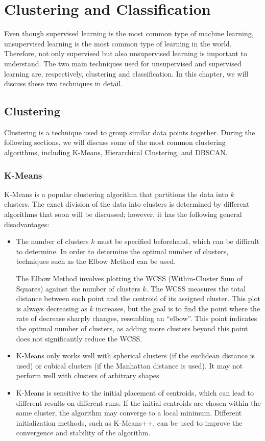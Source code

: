 \chapter{Clustering and Classification}

Even though supervised learning is the most common type of machine learning, unsupervised learning is the most common type of learning in the world. Therefore, not only supervised but also unsupervised learning is important to understand. The two main techniques used for unsupervised and supervised learning are, respectively, clustering and classification. In this chapter, we will discuss these two techniques in detail.

\section{Clustering}

Clustering is a technique used to group similar data points together. During the following sections, we will discuss some of the most common clustering algorithms, including K-Means, Hierarchical Clustering, and DBSCAN.

\subsection{K-Means}

K-Means is a popular clustering algorithm that partitions the data into $k$ clusters. The exact division of the data into clusters is determined by different algorithms that soon will be discussed; however, it has the following general disadvantages:
\begin{itemize}
    \item The number of clusters $k$ must be specified beforehand, which can be difficult to determine. In order to determine the optimal number of clusters, techniques such as the Elbow Method can be used.
    
    The Elbow Method involves plotting the WCSS (Within-Cluster Sum of Squares) against the number of clusters $k$. The WCSS measures the total distance between each point and the centroid of its assigned cluster. This plot is always decreasing as $k$ increases, but the goal is to find the point where the rate of decrease sharply changes, resembling an ``elbow''. This point indicates the optimal number of clusters, as adding more clusters beyond this point does not significantly reduce the WCSS.
    \item K-Means only works well with spherical clusters (if the euclidean distance is used) or cubical clusters (if the Manhattan distance is used). It may not perform well with clusters of arbitrary shapes.
    \item K-Means is sensitive to the initial placement of centroids, which can lead to different results on different runs. If the initial centroids are chosen within the same cluster, the algorithm may converge to a local minimum. Different initialization methods, such as K-Means++, can be used to improve the convergence and stability of the algorithm.
\end{itemize}

